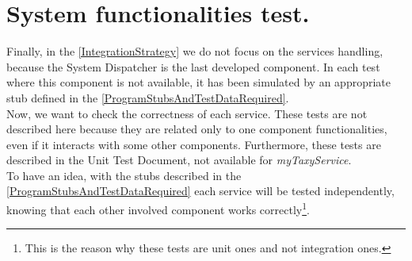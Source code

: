 \documentclass[\mainpath/main]{subfiles}
\begin{document}
\section{System functionalities test.}
Finally, in the \autoref{IntegrationStrategy} we do not focus on the services handling, because the System Dispatcher is the last developed component. In each test where this component is not available, it has been simulated by an appropriate stub defined in the \autoref{ProgramStubsAndTestDataRequired}.\\
Now, we want to check the correctness of each service. These tests are not described here because they are related only to one component functionalities, even if it interacts with some other components. Furthermore, these tests are described in the Unit Test Document, not available for \textit{myTaxyService}.\\
To have an idea, with the stubs described in the \autoref{ProgramStubsAndTestDataRequired}
each service will be tested independently, knowing that each other involved component works correctly\footnote{This is the reason why these tests are unit ones and not integration ones.}.
\end{document}
